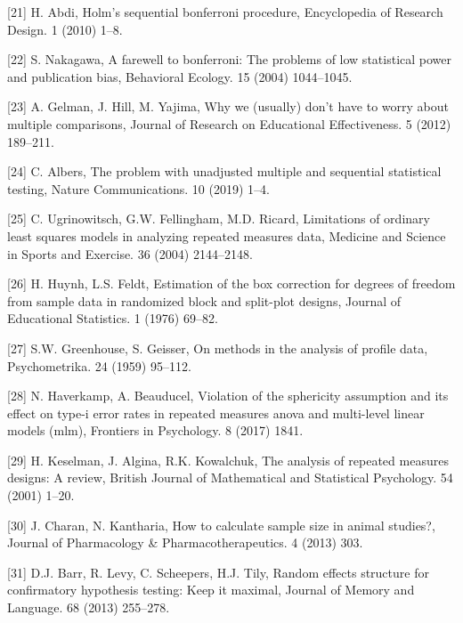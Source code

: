 \documentclass[
]{article}
\begin{document}
\leavevmode\hypertarget{ref-abdi2010}{}%
{[}21{]} H. Abdi, Holm's sequential bonferroni procedure, Encyclopedia of Research Design. 1 (2010) 1--8.

\leavevmode\hypertarget{ref-nakagawa2004}{}%
{[}22{]} S. Nakagawa, A farewell to bonferroni: The problems of low statistical power and publication bias, Behavioral Ecology. 15 (2004) 1044--1045.

\leavevmode\hypertarget{ref-gelman2012}{}%
{[}23{]} A. Gelman, J. Hill, M. Yajima, Why we (usually) don't have to worry about multiple comparisons, Journal of Research on Educational Effectiveness. 5 (2012) 189--211.

\leavevmode\hypertarget{ref-albers2019}{}%
{[}24{]} C. Albers, The problem with unadjusted multiple and sequential statistical testing, Nature Communications. 10 (2019) 1--4.

\leavevmode\hypertarget{ref-ugrinowitsch2004}{}%
{[}25{]} C. Ugrinowitsch, G.W. Fellingham, M.D. Ricard, Limitations of ordinary least squares models in analyzing repeated measures data, Medicine and Science in Sports and Exercise. 36 (2004) 2144--2148.

\leavevmode\hypertarget{ref-huynh1976}{}%
{[}26{]} H. Huynh, L.S. Feldt, Estimation of the box correction for degrees of freedom from sample data in randomized block and split-plot designs, Journal of Educational Statistics. 1 (1976) 69--82.

\leavevmode\hypertarget{ref-greenhouse1959}{}%
{[}27{]} S.W. Greenhouse, S. Geisser, On methods in the analysis of profile data, Psychometrika. 24 (1959) 95--112.

\leavevmode\hypertarget{ref-haverkamp2017}{}%
{[}28{]} N. Haverkamp, A. Beauducel, Violation of the sphericity assumption and its effect on type-i error rates in repeated measures anova and multi-level linear models (mlm), Frontiers in Psychology. 8 (2017) 1841.

\leavevmode\hypertarget{ref-keselman2001}{}%
{[}29{]} H. Keselman, J. Algina, R.K. Kowalchuk, The analysis of repeated measures designs: A review, British Journal of Mathematical and Statistical Psychology. 54 (2001) 1--20.

\leavevmode\hypertarget{ref-charan2013}{}%
{[}30{]} J. Charan, N. Kantharia, How to calculate sample size in animal studies?, Journal of Pharmacology \& Pharmacotherapeutics. 4 (2013) 303.

\leavevmode\hypertarget{ref-barr2013}{}%
{[}31{]} D.J. Barr, R. Levy, C. Scheepers, H.J. Tily, Random effects structure for confirmatory hypothesis testing: Keep it maximal, Journal of Memory and Language. 68 (2013) 255--278.
\end{document}
